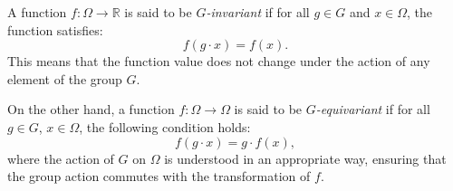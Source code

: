 A function \( f : \Omega \to \mathbb{R} \) is said to be \emph{\( G \)-invariant} if for all \( g \in G \) and \( x \in \Omega \), the function satisfies:
\[
f(g \cdot x) = f(x).
\]
This means that the function value does not change under the action of any element of the group \( G \).

On the other hand, a function \( f : \Omega \to \Omega \) is said to be \emph{\( G \)-equivariant} if for all \( g \in G \), \( x \in \Omega \), the following condition holds:
\[
f(g \cdot x) = g \cdot f(x),
\]
where the action of \( G \) on \( \Omega \) is understood in an appropriate way, ensuring that the group action commutes with the transformation of \( f \). 

